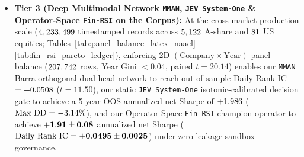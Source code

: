 \begin{itemize}
    \item \textbf{Tier 3 (Deep Multimodal Network \texttt{MMAN}, \texttt{JEV System-One} \& Operator-Space \texttt{Fin-RSI} on the \CorpusTotalShort{} Corpus):} At the cross-market production scale ($4,233,499$ timestamped records across $5,122$ A-share and $81$ US equities; Tables~\ref{tab:panel_balance_latex_naacl}--\ref{tab:fin_rsi_pareto_ledger}), enforcing 2D $(\text{Company} \times \text{Year})$ panel balance ($207,742$ rows, Year Gini $<0.04$, paired $t=20.14$) enables our \texttt{MMAN} Barra-orthogonal dual-head network to reach out-of-sample Daily Rank IC $= +0.0508$ ($t=11.50$), our static \texttt{JEV System-One} isotonic-calibrated decision gate to achieve a 5-year OOS annualized net Sharpe of $+1.986$ ($\text{Max DD} = -3.14\%$), and our Operator-Space \texttt{Fin-RSI} champion operator to achieve $\mathbf{+1.91{} \pm 0.08{}}$ annualized net Sharpe ($\text{Daily Rank IC} = \mathbf{+0.0495{} \pm 0.0025{}}$) under zero-leakage sandbox governance.
\end{itemize}

